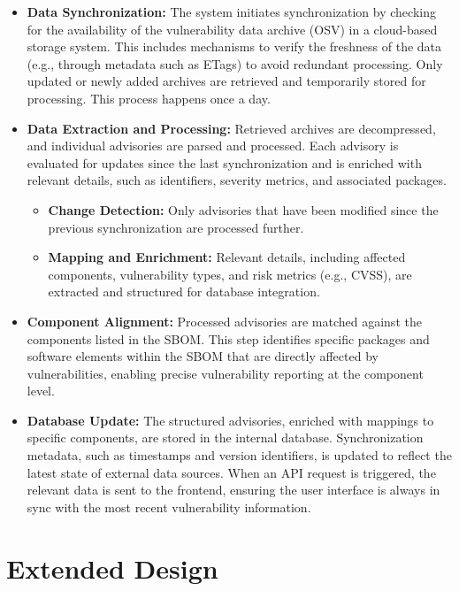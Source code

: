 \begin{itemize}
    \item \textbf{Data Synchronization:} The system initiates synchronization by checking for the availability of the vulnerability data archive (\ac{OSV}) in a cloud-based storage system. This includes mechanisms to verify the freshness of the data (e.g., through metadata such as ETags) to avoid redundant processing. Only updated or newly added archives are retrieved and temporarily stored for processing. This process happens once a day.

    \item \textbf{Data Extraction and Processing:} Retrieved archives are decompressed, and individual advisories are parsed and processed. Each advisory is evaluated for updates since the last synchronization and is enriched with relevant details, such as identifiers, severity metrics, and associated packages. 
    \begin{itemize}
        \item \textbf{Change Detection:} Only advisories that have been modified since the previous synchronization are processed further.
        \item \textbf{Mapping and Enrichment:} Relevant details, including affected components, vulnerability types, and risk metrics (e.g., \ac{CVSS}), are extracted and structured for database integration.
    \end{itemize}

    \item \textbf{Component Alignment:} Processed advisories are matched against the components listed in the \ac{SBOM}. This step identifies specific packages and software elements within the \ac{SBOM} that are directly affected by vulnerabilities, enabling precise vulnerability reporting at the component level.

    \item \textbf{Database Update:} The structured advisories, enriched with mappings to specific components, are stored in the internal database. Synchronization metadata, such as timestamps and version identifiers, is updated to reflect the latest state of external data sources. When an \ac{API} request is triggered, the relevant data is sent to the frontend, ensuring the user interface is always in sync with the most recent vulnerability information.
\end{itemize}

\section{Extended Design}
\label{sec:extended-design}

